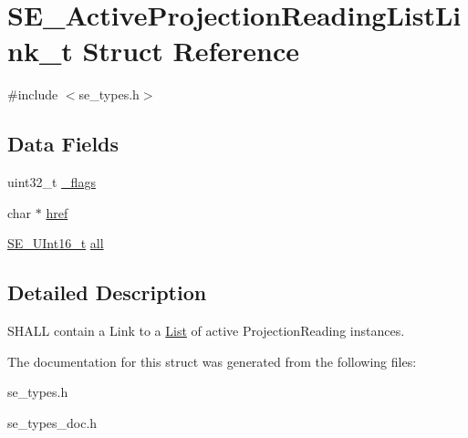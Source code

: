\hypertarget{structSE__ActiveProjectionReadingListLink__t}{}\section{S\+E\+\_\+\+Active\+Projection\+Reading\+List\+Link\+\_\+t Struct Reference}
\label{structSE__ActiveProjectionReadingListLink__t}


{\ttfamily \#include $<$se\+\_\+types.\+h$>$}

\subsection*{Data Fields}
\begin{DoxyCompactItemize}
\item 
uint32\+\_\+t \hyperlink{group__ActiveProjectionReadingListLink_ga6816bac33a95b7122188dfd08ed74309}{\+\_\+flags}
\item 
char $\ast$ \hyperlink{group__ActiveProjectionReadingListLink_ga4ad9d924109e8d23a60f84f807a6e316}{href}
\item 
\hyperlink{group__UInt16_gac68d541f189538bfd30cfaa712d20d29}{S\+E\+\_\+\+U\+Int16\+\_\+t} \hyperlink{group__ActiveProjectionReadingListLink_gaac6fb00ec846fd582cfa39237ddcdb81}{all}
\end{DoxyCompactItemize}


\subsection{Detailed Description}
S\+H\+A\+LL contain a Link to a \hyperlink{structList}{List} of active Projection\+Reading instances. 

The documentation for this struct was generated from the following files\+:\begin{DoxyCompactItemize}
\item 
se\+\_\+types.\+h\item 
se\+\_\+types\+\_\+doc.\+h\end{DoxyCompactItemize}
